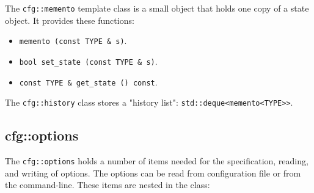    The \texttt{cfg::memento} template class is a small object that holds one
   copy of a state object.
   It provides these functions:

   \begin{itemize}
      \item \texttt{memento (const TYPE \& s)}.
      \item \texttt{bool set\_state (const TYPE \& s)}.
      \item \texttt{const TYPE \& get\_state () const}.
   \end{itemize}

   The \texttt{cfg::history} class stores a "history list":
   \texttt{std::deque<memento<TYPE>>}.

\subsection{cfg::options}
\label{subsec:cfg_namespace_options}

   The \texttt{cfg::options} holds a number of items needed for the
   specification, reading, and writing of options.
   The options can be read from configuration file or from the command-line.
   These items are nested in the class:

